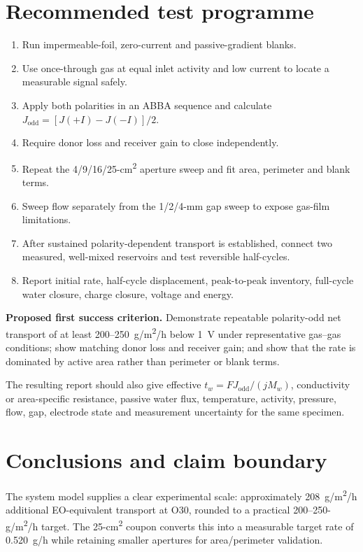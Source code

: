 \documentclass[10pt,a4paper]{article}
\begin{document}
\section{Recommended test programme}

\begin{enumerate}
\item Run impermeable-foil, zero-current and passive-gradient blanks.
\item Use once-through gas at equal inlet activity and low current to locate a
measurable signal safely.
\item Apply both polarities in an ABBA sequence and calculate
$J_{\mathrm{odd}}=[J(+I)-J(-I)]/2$.
\item Require donor loss and receiver gain to close independently.
\item Repeat the 4/9/16/25-cm\textsuperscript{2} aperture sweep and fit area,
perimeter and blank terms.
\item Sweep flow separately from the 1/2/4-mm gap sweep to expose gas-film
limitations.
\item After sustained polarity-dependent transport is established, connect two
measured, well-mixed reservoirs and test reversible half-cycles.
\item Report initial rate, half-cycle displacement, peak-to-peak inventory,
full-cycle water closure, charge closure, voltage and energy.
\end{enumerate}

\begin{gobox}
\textbf{Proposed first success criterion.} Demonstrate repeatable
polarity-odd net transport of at least 200--250~g/m\textsuperscript{2}/h below
1~V under representative gas--gas conditions; show matching donor loss and
receiver gain; and show that the rate is dominated by active area rather than
perimeter or blank terms.
\end{gobox}

The resulting report should also give effective
$t_w=FJ_{\mathrm{odd}}/(jM_w)$, conductivity or area-specific resistance,
passive water flux, temperature, activity, pressure, flow, gap, electrode
state and measurement uncertainty for the same specimen.

\section{Conclusions and claim boundary}

The system model supplies a clear experimental scale: approximately
208~g/m\textsuperscript{2}/h additional EO-equivalent transport at O30, rounded
to a practical 200--250-g/m\textsuperscript{2}/h target. The 25-cm\textsuperscript{2}
coupon converts this into a measurable target rate of 0.520~g/h while retaining
smaller apertures for area/perimeter validation.
\end{document}
